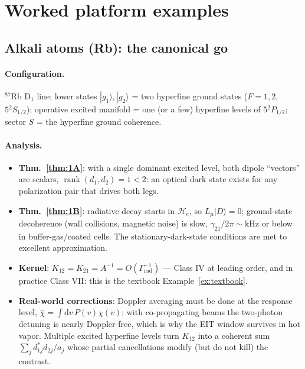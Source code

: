\documentclass[11pt,a4paper]{article}
\theoremstyle{remark}
\newcommand{\He}{\mathcal{H}_e}
\newcommand{\dd}{\mathrm{d}}
\newcommand{\rank}{\operatorname{rank}}
\newcommand{\ket}[1]{|#1\rangle}
\begin{document}
\section{Worked platform examples}

\subsection{Alkali atoms (Rb): the canonical go}

\paragraph{Configuration.}
$^{87}$Rb D$_1$ line; lower states $\ket{g_1},\ket{g_2}$ = two hyperfine
ground states ($F=1,2$, $5{}^2S_{1/2}$); operative excited manifold = one (or
a few) hyperfine levels of $5{}^2P_{1/2}$; sector $S$ = the hyperfine
ground coherence.

\paragraph{Analysis.}
\begin{itemize}
\item \textbf{Thm.~\ref{thm:1A}}: with a single dominant excited level, both
      dipole ``vectors'' are scalars, $\rank(d_1,d_2)=1<2$: an optical dark
      state exists for any polarization pair that drives both legs.
\item \textbf{Thm.~\ref{thm:1B}}: radiative decay starts in $\He$, so
      $L_\mu\ket{D}=0$; ground-state decoherence (wall collisions, magnetic
      noise) is slow, $\gamma_{21}/2\pi\sim\mathrm{kHz}$ or below in
      buffer-gas/coated cells. The stationary-dark-state conditions are met to
      excellent approximation.
\item \textbf{Kernel}: $K_{12}=K_{21}=A^{-1}=O(\Gamma_{\mathrm{rad}}^{-1})$
      --- Class IV at leading order, and in practice Class VII: this is the
      textbook Example~\ref{ex:textbook}.
\item \textbf{Real-world corrections}: Doppler averaging must be done at the
      response level, $\bar\chi=\int\dd v\,P(v)\chi(v)$; with co-propagating
      beams the two-photon detuning is nearly Doppler-free, which is why the
      EIT window survives in hot vapor. Multiple excited hyperfine levels turn
      $K_{12}$ into a coherent sum $\sum_j d_{1j}^*d_{2j}/a_j$ whose partial
      cancellations modify (but do not kill) the contrast.
\end{itemize}
\end{document}
